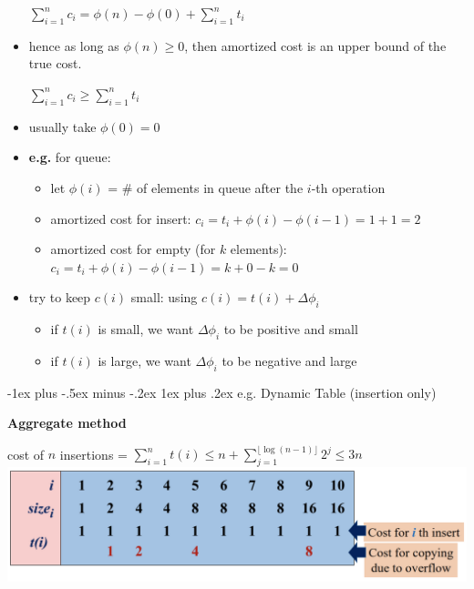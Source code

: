 \documentclass[10pt, landscape]{article}
\makeatletter
\renewcommand{\subsubsection}{\@startsection{subsubsection}{3}{0mm}%
  {-1ex plus -.5ex minus -.2ex}%
  {1ex plus .2ex}%
{\normalfont\small\bfseries}}%
\makeatother
\begin{document}
\begin{multicols*}{4}
\begin{itemize}
\begin{tightcenter}
        $\sum^n_{i=1} c_i = \phi(n) - \phi(0) + \sum^n_{i=1} t_i$
      \end{tightcenter}
    \item hence as long as $\phi(n) \geq 0$, then amortized cost is an upper bound of the true cost. 
      \begin{tightcenter}
        $\sum^n_{i=1} c_i \geq \sum^n_{i=1} t_i$
      \end{tightcenter}
    \item usually take $\phi(0) = 0$
    \item \textbf{e.g.} for queue:
      \begin{itemize}
        \item let $\phi(i)$ = \# of elements in queue after the $i$-th operation
        \item amortized cost for insert: $c_i = t_i + \phi(i) - \phi(i-1) = 1 + 1 = 2$
        \item amortized cost for empty (for $k$ elements): $c_i = t_i + \phi(i) - \phi(i-1) = k + 0 - k = 0 $
      \end{itemize}
    \item try to keep $c(i)$ small: using $c(i) = t(i) + \Delta \phi_i$
      \begin{itemize}
        \item if $t(i)$ is small, we want $\Delta \phi_i$ to be positive and small
        \item if $t(i)$ is large, we want $\Delta \phi_i$ to be negative and large 
      \end{itemize}
  \end{itemize}

  \subsubsection{e.g. Dynamic Table (insertion only)}

  \textbf{Aggregate method}

  \begin{tightcenter}
    cost of $n$ insertions = $\sum^n_{i=1} t(i) \leq n + \sum^{ \lfloor \log(n-1) \rfloor  }_{j=1} 2^j \leq 3n$
    \includegraphics[width=0.95\linewidth]{st2131-dynamic-table-aggregate-method.png} 
  \end{tightcenter}


\end{multicols*}
\end{document}
